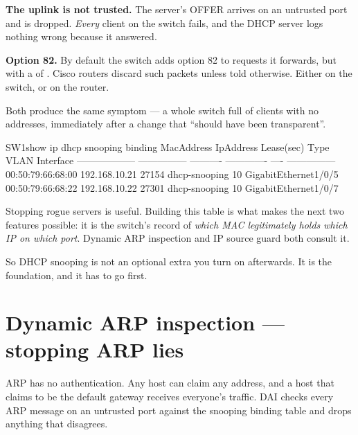 \begin{alertbox}
\begin{tight}
  \item \textbf{The uplink is not trusted.} The server's OFFER arrives on an
        untrusted port and is dropped. \emph{Every} client on the switch fails,
        and the DHCP server logs nothing wrong because it answered.
  \item \textbf{Option 82.} By default the switch adds option 82 to requests it
        forwards, but with a  of . Cisco routers
        discard such packets unless told otherwise. Either
         on the switch, or
         on the router.
\end{tight}

Both produce the same symptom --- a whole switch full of clients with no
addresses, immediately after a change that ``should have been transparent''.
\end{alertbox}

\begin{verify}{SW1}{show ip dhcp snooping binding}
MacAddress          IpAddress        Lease(sec)  Type           VLAN  Interface
------------------  ---------------  ----------  -------------  ----  ---------------
00:50:79:66:68:00   192.168.10.21    27154       dhcp-snooping   10   GigabitEthernet1/0/5
00:50:79:66:68:22   192.168.10.22    27301       dhcp-snooping   10   GigabitEthernet1/0/7
\end{verify}

\begin{conceptbox}
Stopping rogue servers is useful. Building this table is what makes the next two
features possible: it is the switch's record of \emph{which MAC legitimately
holds which IP on which port}. Dynamic ARP inspection and IP source guard both
consult it.

So DHCP snooping is not an optional extra you turn on afterwards. It is the
foundation, and it has to go first.
\end{conceptbox}

\section{Dynamic ARP inspection --- stopping ARP lies}

ARP has no authentication. Any host can claim any address, and a host that claims
to be the default gateway receives everyone's traffic. DAI checks every ARP
message on an untrusted port against the snooping binding table and drops
anything that disagrees.

